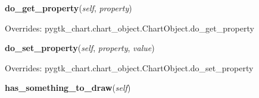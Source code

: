     \vspace{0.5ex}

\hspace{.8\funcindent}\begin{boxedminipage}{\funcwidth}

    \raggedright \textbf{do\_get\_property}(\textit{self}, \textit{property})

\setlength{\parskip}{2ex}
\setlength{\parskip}{1ex}
      Overrides: pygtk\_chart.chart\_object.ChartObject.do\_get\_property

    \end{boxedminipage}

    \vspace{0.5ex}

\hspace{.8\funcindent}\begin{boxedminipage}{\funcwidth}

    \raggedright \textbf{do\_set\_property}(\textit{self}, \textit{property}, \textit{value})

\setlength{\parskip}{2ex}
\setlength{\parskip}{1ex}
      Overrides: pygtk\_chart.chart\_object.ChartObject.do\_set\_property

    \end{boxedminipage}

    \label{pygtk_chart:line_chart:Graph:has_something_to_draw}

    \vspace{0.5ex}

\hspace{.8\funcindent}\begin{boxedminipage}{\funcwidth}

    \raggedright \textbf{has\_something\_to\_draw}(\textit{self})

\setlength{\parskip}{2ex}
\setlength{\parskip}{1ex}
    \end{boxedminipage}

    \label{pygtk_chart:line_chart:Graph:get_x_range}

    \vspace{0.5ex}

